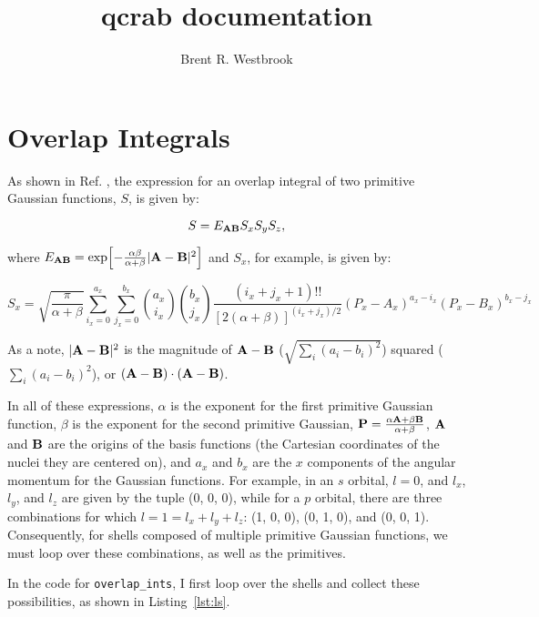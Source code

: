 \documentclass{achemso}
\author{Brent R. Westbrook}
\title{qcrab documentation}
\date{}
\newcommand\eab{E_{\vb A \vb B}}
\begin{document}
\maketitle

\section{Overlap Integrals}
\label{sec:overlap}

As shown in Ref. , the expression for an overlap integral of two
primitive Gaussian functions, $S$, is given by:

\begin{equation}
  \label{eq:s}
  S = \eab S_x S_y S_z,
\end{equation}

\noindent
where $\eab = \exp[-\frac{\alpha\beta}{\alpha + \beta}|\vb A - \vb B|^2]$ and
$S_x$, for example, is given by:

\begin{equation}
  \label{eq:sx}
  S_x = \sqrt{\frac{\pi}{\alpha + \beta}}
  \sum_{i_x = 0}^{a_x}\sum_{j_x = 0}^{b_x}
  \binom{a_x}{i_x} \binom{b_x}{j_x}
  \frac{(i_x + j_x + 1)!!}{[2(\alpha + \beta)]^{(i_x + j_x)/2}}
  (P_x - A_x)^{a_x - i_x}
  (P_x - B_x)^{b_x - j_x}
\end{equation}

\noindent
As a note, $|\vb A - \vb B|^2$ is the magnitude of $\vb A - \vb B$
($\sqrt{\sum_i (a_i - b_i)^2}$) squared ($\sum_i (a_i - b_i)^2$), or
$(\vb A - \vb B) \cdot (\vb A - \vb B)$.

In all of these expressions, $\alpha$ is the exponent for the first primitive
Gaussian function, $\beta$ is the exponent for the second primitive Gaussian,
$\vb P = \frac{\alpha \vb A + \beta \vb B}{\alpha + \beta}$, $\vb A$ and $\vb B$
are the origins of the basis functions (the Cartesian coordinates of the nuclei
they are centered on), and $a_x$ and $b_x$ are the $x$ components of the angular
momentum for the Gaussian functions. For example, in an $s$ orbital, $l = 0$,
and $l_x$, $l_y$, and $l_z$ are given by the tuple (0, 0, 0), while for a $p$
orbital, there are three combinations for which $l = 1 = l_x + l_y + l_z$: (1,
0, 0), (0, 1, 0), and (0, 0, 1). Consequently, for shells composed of multiple
primitive Gaussian functions, we must loop over these combinations, as well as
the primitives.

In the code for \verb|overlap_ints|, I first loop over the shells and collect
these possibilities, as shown in Listing~\ref{lst:ls}.
\end{document}
